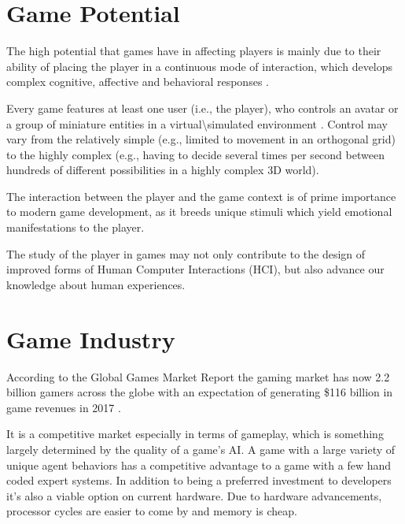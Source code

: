 \section{Game Potential}
The high potential that games have in affecting players is mainly due to their ability of placing the player in a continuous mode of interaction, which develops complex cognitive, affective and behavioral responses \citep{YannakakisPlayerModeling2013}.

Every game features at least one user (i.e., the player), who controls an avatar or a group of miniature entities in a virtual\textbackslash{}simulated environment \citep{CallejaIngameimmersionincorporation2011}.
Control may vary from the relatively simple (e.g., limited to movement in an orthogonal grid) to the highly complex (e.g., having to decide several times per second between hundreds of different possibilities in a highly complex 3D world).

The interaction between the player and the game context is of prime importance to modern game development, as it breeds unique stimuli which yield emotional manifestations to the player.

The study of the player in games may not only contribute to the design of improved forms of Human Computer Interactions (HCI), but also advance our knowledge about human experiences.

\section{Game Industry}
According to the Global Games Market Report \citep{NewGamingBoom} the gaming market has now 2.2 billion gamers across the globe with an expectation of generating \$116 billion in game revenues in 2017 \citep{GlobalGamesMarket}.

It is a competitive market especially in terms of gameplay, which is something largely determined by the quality of a game’s AI.
A game with a large variety of unique agent behaviors has a competitive advantage to a game with a few hand coded expert systems. In addition to being a preferred investment to developers it’s also a viable option on current hardware. Due to hardware advancements, processor cycles are easier to come by and memory is cheap.
